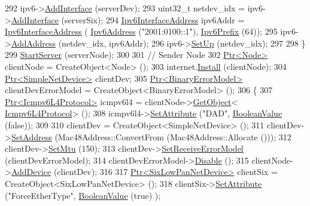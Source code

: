\begin{DoxyCode}
292     ipv6->\hyperlink{classns3_1_1Ipv6_a4fd7da82c16b8abf9ca15f982918e6a4}{AddInterface} (serverDev);
293     uint32\_t netdev\_idx = ipv6->\hyperlink{classns3_1_1Ipv6_a4fd7da82c16b8abf9ca15f982918e6a4}{AddInterface} (serverSix);
294     \hyperlink{classns3_1_1Ipv6InterfaceAddress}{Ipv6InterfaceAddress} ipv6Addr = \hyperlink{classns3_1_1Ipv6InterfaceAddress}{Ipv6InterfaceAddress} (
      \hyperlink{classns3_1_1Ipv6Address}{Ipv6Address} (\textcolor{stringliteral}{"2001:0100::1"}), \hyperlink{classns3_1_1Ipv6Prefix}{Ipv6Prefix} (64));
295     ipv6->\hyperlink{classns3_1_1Ipv6_a5cd576e83cf65445be3a0b5ffd1ddc5c}{AddAddress} (netdev\_idx, ipv6Addr);
296     ipv6->\hyperlink{classns3_1_1Ipv6_a8e61d85ec7fd342ed38fef2d040ed1b9}{SetUp} (netdev\_idx);
297 
298   \}
299   \hyperlink{classSixlowpanFragmentationTest_a2b70baf58418b5e3c1daec1d77f06a84}{StartServer} (serverNode);
300 
301   \textcolor{comment}{// Sender Node}
302   \hyperlink{classns3_1_1Ptr}{Ptr<Node>} clientNode = CreateObject<Node> ();
303   internet.\hyperlink{classns3_1_1InternetStackHelper_a6645b412f31283d2d9bc3d8a95cebbc0}{Install} (clientNode);
304   \hyperlink{classns3_1_1Ptr}{Ptr<SimpleNetDevice>} clientDev;
305   \hyperlink{classns3_1_1Ptr}{Ptr<BinaryErrorModel>} clientDevErrorModel = CreateObject<BinaryErrorModel> ();
306   \{
307     \hyperlink{classns3_1_1Ptr}{Ptr<Icmpv6L4Protocol>} icmpv6l4 = clientNode->\hyperlink{classns3_1_1Object_a13e18c00017096c8381eb651d5bd0783}{GetObject}<
      \hyperlink{classns3_1_1Icmpv6L4Protocol}{Icmpv6L4Protocol}> ();
308     icmpv6l4->\hyperlink{classns3_1_1ObjectBase_ac60245d3ea4123bbc9b1d391f1f6592f}{SetAttribute} (\textcolor{stringliteral}{"DAD"}, \hyperlink{classns3_1_1BooleanValue}{BooleanValue} (\textcolor{keyword}{false}));
309 
310     clientDev = CreateObject<SimpleNetDevice> ();
311     clientDev->\hyperlink{classns3_1_1SimpleNetDevice_a968ef3e7318bac29d5f1d7d977029af4}{SetAddress} (Mac48Address::ConvertFrom (Mac48Address::Allocate ()));
312     clientDev->\hyperlink{classns3_1_1SimpleNetDevice_ab41676e626a91832291bcfbd55ee454a}{SetMtu} (150);
313     clientDev->\hyperlink{classns3_1_1SimpleNetDevice_a8674cbc75fa8504bbf6c27b2ca1f5129}{SetReceiveErrorModel} (clientDevErrorModel);
314     clientDevErrorModel->\hyperlink{classns3_1_1ErrorModel_a55d35a3e713c31f650577e9f96cf25c0}{Disable} ();
315     clientNode->\hyperlink{classns3_1_1Node_a42ff83ee1d5d1649c770d3f5b62375de}{AddDevice} (clientDev);
316 
317     \hyperlink{classns3_1_1Ptr}{Ptr<SixLowPanNetDevice>} clientSix = CreateObject<SixLowPanNetDevice> ();
318     clientSix->\hyperlink{classns3_1_1ObjectBase_ac60245d3ea4123bbc9b1d391f1f6592f}{SetAttribute} (\textcolor{stringliteral}{"ForceEtherType"}, \hyperlink{classns3_1_1BooleanValue}{BooleanValue} (\textcolor{keyword}{true}) );

\end{DoxyCode}
